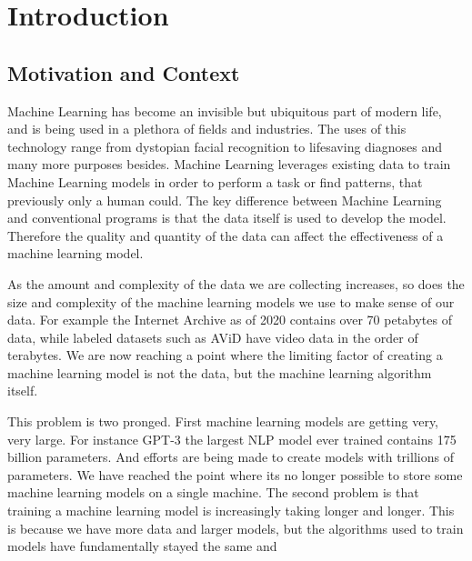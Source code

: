 
\section{Introduction}

\subsection{Motivation and Context}

Machine Learning has become an invisible but ubiquitous part of modern life, and
is being used in a plethora of fields and industries. The uses of this
technology range from dystopian facial recognition
\cite{mattBurgessFacialRecognision} to lifesaving diagnoses
\cite{Mammograms2020} and many more purposes besides. Machine Learning leverages
existing data to train Machine Learning models in order to perform a task or
find patterns, that previously only a human could. The key difference between
Machine Learning and conventional programs is that the data itself is used to
develop the model. Therefore the quality and quantity of the data can affect the
effectiveness of a machine learning model.
\par
As the amount and complexity of the data we are collecting increases, so does the
size and complexity of the machine learning models we use to make sense of our
data. For example the Internet Archive as of 2020 contains over 70 petabytes of
data, while labeled datasets such as AViD have video data in the order of
terabytes. \cite{piergiovanni2020avid} We are now reaching a point where the
limiting factor of creating a machine learning model is not the data, but the
machine learning algorithm itself.
\par
This problem is two pronged. First machine learning models are getting very,
very large. For instance GPT-3 the largest NLP model ever trained
contains 175 billion parameters. \cite{fewshowlearners2020gpt} And efforts are
being made to create models with trillions of parameters.
\cite{rajbhandari2020zero} We have reached the point where its no longer
possible to store some machine learning models on a single
machine.\cite{LI2014ParameterServers}
The second problem is that training a machine learning model is increasingly
taking longer and longer. This is because we have more data and larger models,
but the algorithms used to train models have fundamentally stayed the same and
